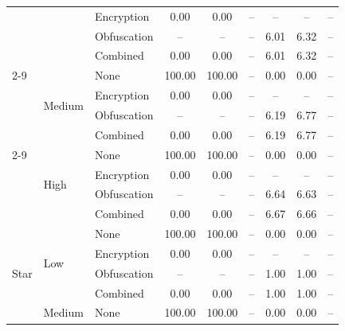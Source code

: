 \begin{table}[!t]
\begin{tabular}{lllccc ccc}
 &  & Encryption & \cellcolor[gray]{0.70}0.00 & \cellcolor[gray]{0.70}0.00 & -- & -- & -- & -- \\
 &  & Obfuscation & -- & -- & -- & 6.01 & \cellcolor[gray]{0.70}6.32 & -- \\
 &  & Combined & \cellcolor[gray]{0.70}0.00 & \cellcolor[gray]{0.70}0.00 & -- & 6.01 & \cellcolor[gray]{0.70}6.32 & -- \\
\cmidrule(lr){2-9}
 & \multirow{4}{*}{Medium} & None & \cellcolor[gray]{0.70}100.00 & \cellcolor[gray]{0.70}100.00 & -- & \cellcolor[gray]{0.70}0.00 & \cellcolor[gray]{0.70}0.00 & -- \\
 &  & Encryption & \cellcolor[gray]{0.70}0.00 & \cellcolor[gray]{0.70}0.00 & -- & -- & -- & -- \\
 &  & Obfuscation & -- & -- & -- & 6.19 & \cellcolor[gray]{0.70}6.77 & -- \\
 &  & Combined & \cellcolor[gray]{0.70}0.00 & \cellcolor[gray]{0.70}0.00 & -- & 6.19 & \cellcolor[gray]{0.70}6.77 & -- \\
\cmidrule(lr){2-9}
 & \multirow{4}{*}{High} & None & \cellcolor[gray]{0.70}100.00 & \cellcolor[gray]{0.70}100.00 & -- & \cellcolor[gray]{0.70}0.00 & \cellcolor[gray]{0.70}0.00 & -- \\
 &  & Encryption & \cellcolor[gray]{0.70}0.00 & \cellcolor[gray]{0.70}0.00 & -- & -- & -- & -- \\
 &  & Obfuscation & -- & -- & -- & \cellcolor[gray]{0.70}6.64 & 6.63 & -- \\
 &  & Combined & \cellcolor[gray]{0.70}0.00 & \cellcolor[gray]{0.70}0.00 & -- & \cellcolor[gray]{0.70}6.67 & 6.66 & -- \\
\midrule
\multirow{12}{*}{Star} & \multirow{4}{*}{Low} & None & \cellcolor[gray]{0.70}100.00 & \cellcolor[gray]{0.70}100.00 & -- & \cellcolor[gray]{0.70}0.00 & \cellcolor[gray]{0.70}0.00 & -- \\
 &  & Encryption & \cellcolor[gray]{0.70}0.00 & \cellcolor[gray]{0.70}0.00 & -- & -- & -- & -- \\
 &  & Obfuscation & -- & -- & -- & \cellcolor[gray]{0.70}1.00 & \cellcolor[gray]{0.70}1.00 & -- \\
 &  & Combined & \cellcolor[gray]{0.70}0.00 & \cellcolor[gray]{0.70}0.00 & -- & \cellcolor[gray]{0.70}1.00 & \cellcolor[gray]{0.70}1.00 & -- \\
\cmidrule(lr){2-9}
 & \multirow{4}{*}{Medium} & None & \cellcolor[gray]{0.70}100.00 & \cellcolor[gray]{0.70}100.00 & -- & \cellcolor[gray]{0.70}0.00 & \cellcolor[gray]{0.70}0.00 & -- \\

\end{tabular}
\end{table}
